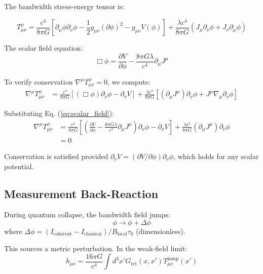 \documentclass[twocolumn,prd,amsmath,amssymb,aps,superscriptaddress,nofootinbib]{revtex4-2}
\begin{document}
The bandwidth stress-energy tensor is:
\begin{widetext}
\begin{equation}
T_{\mu\nu}^\phi = \frac{c^4}{8\pi G}\left[\partial_\mu\phi \partial_\nu\phi - \frac{1}{2}g_{\mu\nu}(\partial\phi)^2 - g_{\mu\nu} V(\phi)\right] + \frac{\lambda c^4}{8\pi G}(J_\mu \partial_\nu\phi + J_\nu \partial_\mu\phi)
\end{equation}
\end{widetext}

The scalar field equation:
\begin{equation}
\Box\phi = \frac{\partial V}{\partial\phi} - \frac{8\pi G\lambda}{c^4} \partial_\mu J^\mu
\label{eq:scalar_field}
\end{equation}

To verify conservation $\nabla^\mu T_{\mu\nu}^\phi = 0$, we compute:
\begin{align}
\nabla^\mu T_{\mu\nu}^\phi &= \frac{c^4}{8\pi G}\left[(\Box\phi)\partial_\nu\phi - \partial_\nu V\right] + \frac{\lambda c^4}{8\pi G}\left[(\partial_\mu J^\mu)\partial_\nu\phi + J^\mu\nabla_\mu\partial_\nu\phi\right]
\end{align}

Substituting Eq. (\ref{eq:scalar_field}):
\begin{align}
\nabla^\mu T_{\mu\nu}^\phi &= \frac{c^4}{8\pi G}\left[\left(\frac{\partial V}{\partial\phi} - \frac{8\pi G\lambda}{c^4}\partial_\mu J^\mu\right)\partial_\nu\phi - \partial_\nu V\right] + \frac{\lambda c^4}{8\pi G}(\partial_\mu J^\mu)\partial_\nu\phi \\
&= 0
\end{align}

Conservation is satisfied provided $\partial_\nu V = (\partial V/\partial\phi)\partial_\nu\phi$, which holds for any scalar potential.

\subsection{Measurement Back-Reaction}

During quantum collapse, the bandwidth field jumps:
\begin{equation}
\phi \rightarrow \phi + \Delta\phi
\end{equation}
where $\Delta\phi = (I_{\text{coherent}} - I_{\text{classical}})/B_{\text{local}} \tau_0$ (dimensionless).

This sources a metric perturbation. In the weak-field limit:
\begin{equation}
h_{\mu\nu} = \frac{16\pi G}{c^4} \int d^3x' G_{\text{ret}}(x,x') T_{\mu\nu}^{\text{jump}}(x')
\end{equation}
\end{document}
